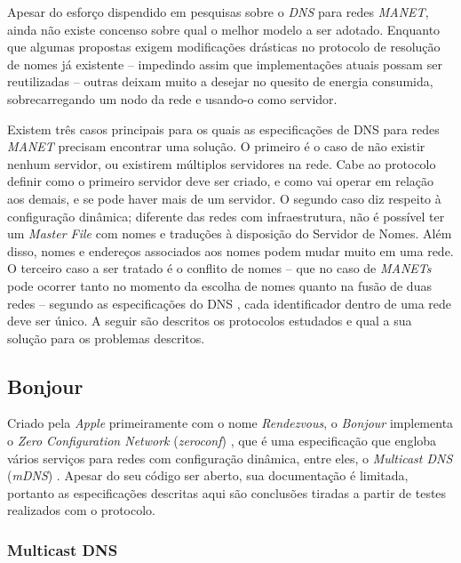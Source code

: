 
Apesar do esforço dispendido em pesquisas sobre o \textit{DNS} para redes 
\textit{MANET}, ainda não existe concenso sobre qual o melhor modelo a ser 
adotado. Enquanto que algumas propostas exigem modificações drásticas no 
protocolo de resolução de nomes já existente -- impedindo assim que 
implementações atuais possam ser reutilizadas -- outras deixam muito a desejar 
no quesito de energia consumida, sobrecarregando um nodo da rede e usando-o como
 servidor.

Existem três casos principais para os quais as especificações de DNS para redes 
\textit{MANET} precisam encontrar uma solução. O primeiro é o caso de não existir 
nenhum servidor, ou existirem múltiplos servidores na rede. Cabe ao protocolo 
definir como o primeiro servidor deve ser criado, e como vai operar em relação 
aos demais, e se pode haver mais de um servidor. O segundo caso diz respeito à 
configuração dinâmica; diferente das redes com infraestrutura, não é possível 
ter um \textit{Master File} com nomes e traduções à disposição do Servidor de 
Nomes. Além disso, nomes e endereços associados aos nomes podem mudar muito em 
uma rede. O terceiro caso a ser tratado é o conflito de nomes -- que no caso de 
\textit{MANETs} pode ocorrer tanto no momento da escolha de nomes quanto na fusão
 de duas redes -- segundo as especificações do DNS \cite{rfc1035}, cada 
 identificador dentro de uma rede deve ser único. A seguir são descritos os 
 protocolos estudados e qual a sua solução para os problemas descritos.

\subsection{Bonjour}
\label{Bonjour}

    Criado pela \textit{Apple} primeiramente com o nome \textit{Rendezvous}, o 
    \textit{Bonjour} implementa o \textit{Zero Configuration Network} 
    (\textit{zeroconf}) \cite{zeroconf}, que é uma especificação que engloba vários
    serviços para redes com configuração dinâmica, entre eles, o 
    \textit{Multicast DNS} (\textit{mDNS}) \cite{mdns}. Apesar do seu código ser 
    aberto, sua documentação é limitada, portanto as especificações descritas aqui
    são conclusões tiradas a partir de testes realizados com o protocolo.
  
    \subsubsection{Multicast DNS}
    \label{MDNS}
  
